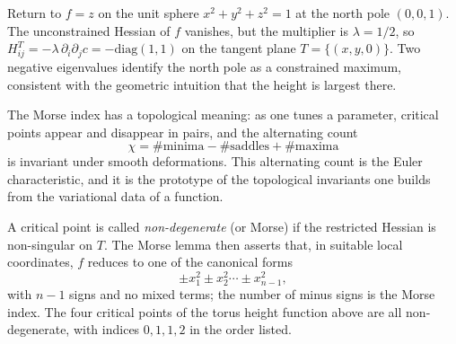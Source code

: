 \begin{example}
Return to $f=z$ on the unit sphere $x^2+y^2+z^2=1$ at the north pole $(0,0,1)$. The unconstrained Hessian of $f$ vanishes, but the multiplier is $\lambda=1/2$, so $H^{T}_{ij}=-\lambda\,\partial_i\partial_j c=-\mathrm{diag}(1,1)$ on the tangent plane $T=\{(x,y,0)\}$. Two negative eigenvalues identify the north pole as a constrained maximum, consistent with the geometric intuition that the height is largest there.
\end{example}

The Morse index has a topological meaning: as one tunes a parameter, critical points appear and disappear in pairs, and the alternating count
\begin{equation}
\chi=\#\text{minima}-\#\text{saddles}+\#\text{maxima}
\end{equation}
is invariant under smooth deformations. This alternating count is the Euler characteristic, and it is the prototype of the topological invariants one builds from the variational data of a function.

A critical point is called \emph{non-degenerate} (or Morse) if the restricted Hessian is non-singular on $T$. The Morse lemma then asserts that, in suitable local coordinates, $f$ reduces to one of the canonical forms
\begin{equation}
\pm x_1^2\pm x_2^2\cdots\pm x_{n-1}^2,
\end{equation}
with $n-1$ signs and no mixed terms; the number of minus signs is the Morse index. The four critical points of the torus height function above are all non-degenerate, with indices $0,1,1,2$ in the order listed.
